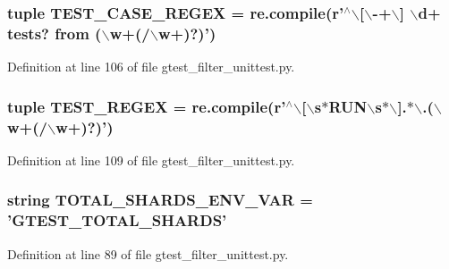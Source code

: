 \hypertarget{namespacegtest__filter__unittest_a4330f7f7cad334d88b3407948ff564a8}{
\subsubsection[{\-T\-E\-S\-T\-\_\-\-C\-A\-S\-E\-\_\-\-R\-E\-G\-E\-X}]{\setlength{\rightskip}{0pt plus 5cm}tuple {\bf \-T\-E\-S\-T\-\_\-\-C\-A\-S\-E\-\_\-\-R\-E\-G\-E\-X} = re.\-compile(r'$^\wedge$$\backslash$\mbox{[}$\backslash$-\/+$\backslash$\mbox{]} $\backslash$d+ tests? from ($\backslash$w+(/$\backslash$w+)?)')}}\label{d5/dea/namespacegtest__filter__unittest_a4330f7f7cad334d88b3407948ff564a8}


\-Definition at line 106 of file gtest\-\_\-filter\-\_\-unittest.\-py.

\hypertarget{namespacegtest__filter__unittest_a293d86c2c782e2c06c8c9368763ef189}{
\subsubsection[{\-T\-E\-S\-T\-\_\-\-R\-E\-G\-E\-X}]{\setlength{\rightskip}{0pt plus 5cm}tuple {\bf \-T\-E\-S\-T\-\_\-\-R\-E\-G\-E\-X} = re.\-compile(r'$^\wedge$$\backslash$\mbox{[}$\backslash$s$\ast$\-R\-U\-N$\backslash$s$\ast$$\backslash$\mbox{]}.$\ast$$\backslash$.($\backslash$w+(/$\backslash$w+)?)')}}\label{d5/dea/namespacegtest__filter__unittest_a293d86c2c782e2c06c8c9368763ef189}


\-Definition at line 109 of file gtest\-\_\-filter\-\_\-unittest.\-py.

\hypertarget{namespacegtest__filter__unittest_a29eb92c501c01a11bd57180093e5548f}{
\subsubsection[{\-T\-O\-T\-A\-L\-\_\-\-S\-H\-A\-R\-D\-S\-\_\-\-E\-N\-V\-\_\-\-V\-A\-R}]{\setlength{\rightskip}{0pt plus 5cm}string {\bf \-T\-O\-T\-A\-L\-\_\-\-S\-H\-A\-R\-D\-S\-\_\-\-E\-N\-V\-\_\-\-V\-A\-R} = '\-G\-T\-E\-S\-T\-\_\-\-T\-O\-T\-A\-L\-\_\-\-S\-H\-A\-R\-D\-S'}}\label{d5/dea/namespacegtest__filter__unittest_a29eb92c501c01a11bd57180093e5548f}


\-Definition at line 89 of file gtest\-\_\-filter\-\_\-unittest.\-py.

